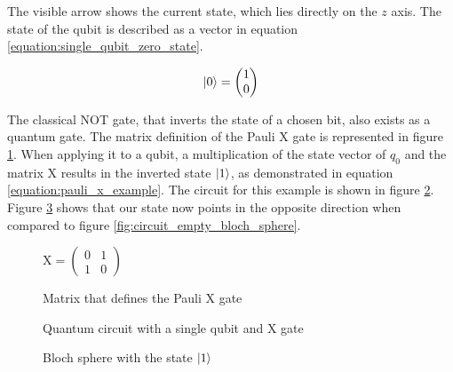 The visible arrow shows the current state, which lies directly on the $z$ axis. The state of the qubit is described as a vector in equation \ref{equation:single_qubit_zero_state}.

\begin{equation}
    \ket{0} = \begin{pmatrix}1 \\ 0\end{pmatrix}
    \label{equation:single_qubit_zero_state}
\end{equation}

The classical NOT gate, that inverts the state of a chosen bit, also exists as a quantum gate. The matrix definition of the Pauli $\mathrm{X}$\cite{qiskit_xgate_nodate} gate is represented in figure \ref{fig:matrix_pauli_x}. When applying it to a qubit, a multiplication of the state vector of $q_0$ and the matrix $\mathrm{X}$ results in the inverted state $\ket{1}$, as demonstrated in equation \ref{equation:pauli_x_example}. The circuit for this example is shown in figure \ref{fig:circuit_negated_empty}. Figure \ref{fig:circuit_negated_empty_bloch_sphere} shows that our state now points in the opposite direction when compared to figure \ref{fig:circuit_empty_bloch_sphere}.

\begin{figure}
    \centering
    $\mathrm{X} = \begin{pmatrix}
        0 & 1 \\
        1 & 0
    \end{pmatrix}$
    \caption{Matrix that defines the Pauli $\mathrm{X}$ gate}
    \label{fig:matrix_pauli_x}
\end{figure}

\begin{figure}[!h]
    \centering
    \caption{Quantum circuit with a single qubit and $\mathrm{X}$ gate}
    \label{fig:circuit_negated_empty}
\end{figure}

\begin{figure}[!h]
    \centering
    \caption{Bloch sphere with the state $\ket{1}$}
    \label{fig:circuit_negated_empty_bloch_sphere}
\end{figure}


